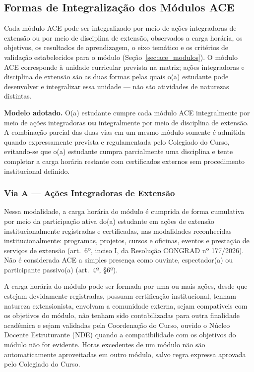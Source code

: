 \subsection{Formas de Integralização dos Módulos ACE}
\label{sec:ace_formas_integralizacao}

Cada módulo ACE pode ser integralizado por meio de ações integradoras de extensão ou por meio de disciplina de extensão, observados a carga horária, os objetivos, os resultados de aprendizagem, o eixo temático e os critérios de validação estabelecidos para o módulo (Seção~\ref{sec:ace_modulos}\unskip). O módulo ACE corresponde à unidade curricular prevista na matriz; ações integradoras e disciplina de extensão são as duas formas pelas quais o(a) estudante pode desenvolver e integralizar essa unidade — não são atividades de naturezas distintas.

\textbf{Modelo adotado.} O(a) estudante cumpre cada módulo ACE integralmente por meio de ações integradoras \textbf{ou} integralmente por meio de disciplina de extensão. A combinação parcial das duas vias em um mesmo módulo somente é admitida quando expressamente prevista e regulamentada pelo Colegiado do Curso, evitando-se que o(a) estudante cumpra parcialmente uma disciplina e tente completar a carga horária restante com certificados externos sem procedimento institucional definido.

\subsubsection{Via A --- Ações Integradoras de Extensão}

Nessa modalidade, a carga horária do módulo é cumprida de forma cumulativa por meio da participação ativa do(a) estudante em ações de extensão institucionalmente registradas e certificadas, nas modalidades reconhecidas institucionalmente: programas, projetos, cursos e oficinas, eventos e prestação de serviços de extensão (art.\ 6º, inciso I, da Resolução CONGRAD nº 177/2026). Não é considerada ACE a simples presença como ouvinte, espectador(a) ou participante passivo(a) (art.\ 4º, §6º).

A carga horária do módulo pode ser formada por uma ou mais ações, desde que estejam devidamente registradas, possuam certificação institucional, tenham natureza extensionista, envolvam a comunidade externa, sejam compatíveis com os objetivos do módulo, não tenham sido contabilizadas para outra finalidade acadêmica e sejam validadas pela Coordenação do Curso, ouvido o Núcleo Docente Estruturante (NDE) quando a compatibilidade com os objetivos do módulo não for evidente. Horas excedentes de um módulo não são automaticamente aproveitadas em outro módulo, salvo regra expressa aprovada pelo Colegiado do Curso.

